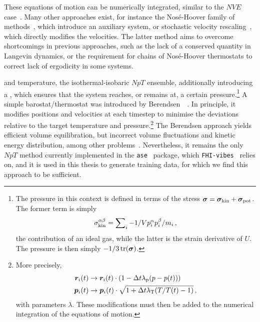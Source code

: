 These equations of motion can be numerically integrated, similar to the $NVE$ case~\cite{vc2006p,bp2007p}. Many other approaches exist, for instance the Nosé-Hoover family of methods~\cite{n1984p,h1985p,mkt1992p}, which introduce an auxiliary system, or stochastic velocity rescaling~\cite{bdp2007p}, which directly modifies the velocities. The latter method aims to overcome shortcomings in previous approaches, such as the lack of a conserved quantity in Langevin dynamics, or the requirement for chains of Nosé-Hoover thermostats to correct lack of ergodicity in some systems.

 and temperature, the isothermal-isobaric $NpT$ ensemble, additionally introducing a , which ensures that the system reaches, or remains at, a certain pressure.\footnote[][-4\baselineskip]{The pressure in this context is defined in terms of the stress $\boldsymbol{\sigma} = \boldsymbol{\sigma}_{\text{kin}} + \boldsymbol{\sigma}_{\text{pot}}$. The former term is simply
\begin{equation}
	\sigma_{\text{kin}}^{\alpha \beta} = \sum_i\nolimits -1/V p^\alpha_i p^\beta_i / m_i \, ,
\end{equation}
the contribution of an ideal gas, while the latter is the strain derivative of $U$.
The pressure is then simply $-1/3\, \text{tr}(\boldsymbol{\sigma})$.}
A simple barostat/thermostat was introduced by Berendsen~\etal~\cite{bpdh1984p}.
In principle, it modifies positions and velocities at each timestep to minimise the deviations relative to the target temperature and pressure.\footnote{More precisely,
\begin{align*}
	\boldsymbol{r}_i(t) &\rightarrow \boldsymbol{r}_i(t) \cdot \left(1 - \Delta t \lambda_{\text{p}} (p - p(t))\right) \\
	\boldsymbol{p}_i(t) &\rightarrow \boldsymbol{p}_i(t) \cdot \sqrt{1 + \Delta t \lambda_{\text{T}} (T/T(t)-1)} \, ,
\end{align*}
with parameters $\lambda$. These modifications must then be added to the numerical integration of the equations of motion.
}
The Berendsen approach yields efficient volume equilibration, but incorrect volume fluctuations and kinetic energy distribution, among other problems~\cite{s2013p}.
Nevertheless, it remains the only $NpT$ method currently implemented in the \texttt{ase}~\cite{ase} package, which \texttt{FHI-vibes}~\cite{FHI-vibes} relies on, and it is used in this thesis to generate training data, for which we find this approach to be sufficient.


